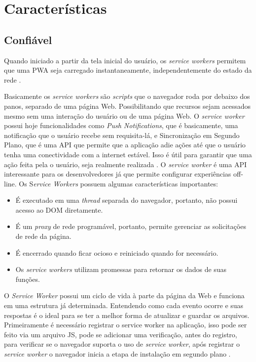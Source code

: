\section{Características}
\label{s_c4_caractetisticas}

\subsection{Confiável}
Quando iniciado a partir da tela inicial do usuário, os \textit{service workers} permitem que uma \ac{PWA} seja carregado instantaneamente, independentemente do estado da rede \cite{pwa}.


Basicamente os \textit{service workers} são \textit{scripts} que o navegador roda por debaixo dos panos, separado de uma página Web. Possibilitando que recursos sejam acessados mesmo sem uma interação do usuário ou de uma página Web. O \textit{service worker} possui hoje funcionalidades como \textit{Push Notifications}, que é basicamente, uma notificação que o usuário recebe sem requisita-lá, e Sincronização em Segundo Plano, que é uma \ac{API} que permite que a aplicação adie ações até que o usuário tenha uma conectividade com a internet estável. Isso é útil para garantir que uma ação feita pela o usuário, seja realmente realizada \cite{servicework}.
O \textit{service worker} é uma \ac{API} interessante para os desenvolvedores já que permite configurar experiências off-line. Os S\textit{ervice Workers} possuem algumas características importantes:

\begin{itemize}
	\item É executado em uma \textit{thread} separada do navegador, portanto, não possui acesso ao \ac{DOM} diretamente.
	\item É um \textit{proxy} de rede programável, portanto, permite gerenciar as solicitações de rede da página.
	\item É encerrado quando ficar ocioso e reiniciado quando for necessário.
	\item Os \textit{service workers} utilizam promessas para retornar os dados de suas funções.
\end{itemize}

O \textit{Service Worker} possui um ciclo de vida à parte da página da Web e funciona em uma estrutura já determinada. Entendendo como cada evento ocorre e suas respostas é o ideal para se ter a melhor forma de atualizar e guardar os arquivos. Primeiramente é necessário registrar o service worker na aplicação, isso pode ser feito via um arquivo \ac{JS}, pode se adicionar uma verificação, antes do registro, para verificar se o navegador suporta o uso de \textit{service worker}, após registrar o \textit{service worker} o navegador inicia a etapa de instalação em segundo plano \cite{pwa2}.


